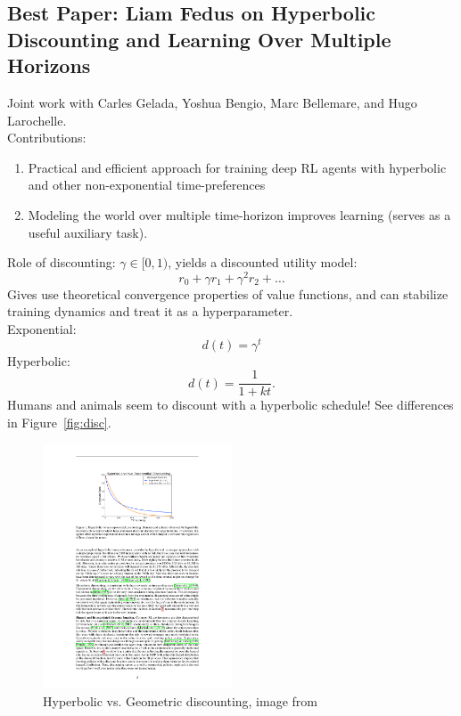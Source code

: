 \spacerule

\subsection{Best Paper: Liam Fedus on Hyperbolic Discounting and
Learning Over Multiple Horizons}

Joint work with Carles Gelada, Yoshua Bengio, Marc Bellemare, and Hugo Larochelle. \\

Contributions:
\begin{enumerate}
    \item Practical and efficient approach for training deep RL agents with hyperbolic and other non-exponential time-preferences
    \item Modeling the world over multiple time-horizon improves learning (serves as a useful auxiliary task).
\end{enumerate}

Role of discounting: $\gamma \in [0,1)$, yields a discounted utility model:
\[
r_0 + \gamma r_1 + \gamma^2 r_2 + \ldots
\]
Gives use theoretical convergence properties of value functions, and can stabilize training dynamics and treat it as a hyperparameter. \\

Exponential:
\[
d(t) = \gamma^t
\]
Hyperbolic:
\[
d(t) = \frac{1}{1+kt}.
\]
Humans and animals seem to discount with a hyperbolic schedule! See differences in Figure~\ref{fig:disc}.

\begin{figure}
    \centering
    \includegraphics[width=0.5\textwidth]{images/disc.pdf}
    \caption{Hyperbolic vs. Geometric discounting, image from~\citet{fedus2019hyperbolic}}
    \label{fig:my_label}
\end{figure}

